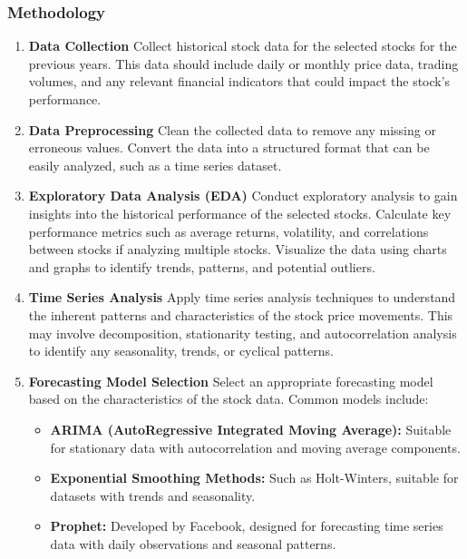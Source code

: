 \subsubsection{Methodology}
\begin{enumerate}

\item \textbf{Data Collection}
Collect historical stock data for the selected stocks for the previous years. This data should include daily or monthly price data, trading volumes, and any relevant financial indicators that could impact the stock's performance.

\item \textbf{Data Preprocessing}
Clean the collected data to remove any missing or erroneous values. Convert the data into a structured format that can be easily analyzed, such as a time series dataset.

\item \textbf{Exploratory Data Analysis (EDA)}
Conduct exploratory analysis to gain insights into the historical performance of the selected stocks. Calculate key performance metrics such as average returns, volatility, and correlations between stocks if analyzing multiple stocks. Visualize the data using charts and graphs to identify trends, patterns, and potential outliers.

\item \textbf{Time Series Analysis}
Apply time series analysis techniques to understand the inherent patterns and characteristics of the stock price movements. This may involve decomposition, stationarity testing, and autocorrelation analysis to identify any seasonality, trends, or cyclical patterns.

\item \textbf{Forecasting Model Selection}
Select an appropriate forecasting model based on the characteristics of the stock data. Common models include:
\begin{itemize}
    \item \textbf{ARIMA (AutoRegressive Integrated Moving Average):} Suitable for stationary data with autocorrelation and moving average components.
    \item \textbf{Exponential Smoothing Methods:} Such as Holt-Winters, suitable for datasets with trends and seasonality.
    \item \textbf{Prophet:} Developed by Facebook, designed for forecasting time series data with daily observations and seasonal patterns.
\end{itemize}
\end{enumerate}
